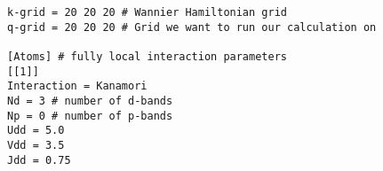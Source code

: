 \documentclass[a4paper,11pt]{article}
\numberwithin{equation}{section} %
\begin{document}
\begin{lstlisting}[caption=example abinitiodga config file, frame=single, basicstyle=\small, style=base2]
k-grid = 20 20 20 # Wannier Hamiltonian grid                                                                                                                                                                                              
q-grid = 20 20 20 # Grid we want to run our calculation on                                                                                                                                                                                                                                                                                                                                                                                                         
                                                                                                                                                                                                              
[Atoms] # fully local interaction parameters                                                                                                                                                                                                        
[[1]]                                                                                                                                                                                                          
Interaction = Kanamori                                                                                                                                                                                         
Nd = 3 # number of d-bands
Np = 0 # number of p-bands                                                                                                                                                                                                         
Udd = 5.0                                                                                                                                                                                                      
Vdd = 3.5                                                                                                                                                                                                      
Jdd = 0.75                                                                                                                                                                                                     
                                                                                                                                                                                                               

\end{lstlisting}
\end{document}
